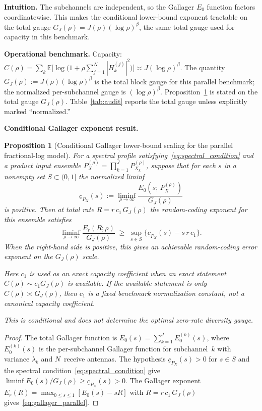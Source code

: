 \documentclass[lettersize,onecolumn]{IEEEtran}
\newtheorem{proposition}{Proposition}
\newcommand{\E}{\mathbb{E}}
\newcommand{\snr}{\rho}
\begin{document}
\textbf{Intuition.}
The subchannels are independent, so the Gallager $E_0$ function
factors coordinatewise. This makes the conditional lower-bound
exponent tractable on the total gauge
$G_J(\snr) = J(\snr)(\log\snr)^\beta$, the same total gauge used
for capacity in this benchmark.

\textbf{Operational benchmark.}
Capacity:
$C(\snr) = \sum_k \E\!\big[\log\!\big(1+\snr\sum_{j=1}^{N}
|H_k^{(j)}|^2\big)\big] \asymp J(\log\snr)^\beta$.
The quantity $G_J(\snr):=J(\snr)(\log\snr)^\beta$ is the total block
gauge for this parallel benchmark; the normalized per-subchannel gauge
is $(\log\snr)^\beta$.
Proposition~\ref{thm:gallager_parallel} is stated on the total
gauge $G_J(\snr)$. Table~\ref{tab:audit} reports the total gauge
unless explicitly marked ``normalized.''

\textbf{Conditional Gallager exponent result.}

\begin{proposition}[Conditional Gallager lower-bound scaling for the
parallel fractional-log model]\label{thm:gallager_parallel}
For a spectral profile satisfying~\eqref{eq:spectral_condition} and
a product input ensemble
$P_X^{(\snr)}=\prod_{k=1}^J P_{X_k}^{(\snr)}$, suppose that for
each $s$ in a nonempty set $S\subset(0,1]$ the normalized liminf
\[
\underline{c}_{P_X}(s)
    :=
    \liminf_{\snr\to\infty}
    \frac{E_0(s;\,P_X^{(\snr)})}{G_J(\snr)}
\]
is positive. Then at total rate $R = r\,c_1\,G_J(\snr)$ the
random-coding exponent for this ensemble satisfies
\begin{equation}\label{eq:gallager_parallel}
\liminf_{\snr\to\infty}
    \frac{E_r(R;\snr)}{G_J(\snr)}
    \;\ge\;
    \sup_{s\in S}
    \{\underline{c}_{P_X}(s) - s\,r\,c_1\}.
\end{equation}
When the right-hand side is positive, this gives an achievable
random-coding error exponent on the $G_J(\snr)$ scale.

Here $c_1$ is used as an exact capacity coefficient when an exact
statement $C(\snr) \sim c_1 G_J(\snr)$ is available. If the available
statement is only $C(\snr) \asymp G_J(\snr)$, then $c_1$ is a fixed
benchmark normalization constant, not a canonical capacity
coefficient.

This is conditional and does not determine the optimal zero-rate
diversity gauge.
\end{proposition}

\begin{proof}
The total Gallager function is $E_0(s) = \sum_{k=1}^{J} E_0^{(k)}(s)$,
where $E_0^{(k)}(s)$ is the per-subchannel Gallager function for
subchannel~$k$ with variance $\lambda_k$ and $N$~receive antennas.
The hypothesis $\underline{c}_{P_X}(s) > 0$ for $s\in S$
and the spectral condition~\eqref{eq:spectral_condition}
give $\liminf E_0(s)/G_J(\snr) \ge \underline{c}_{P_X}(s) > 0$.
The Gallager exponent $E_r(R) = \max_{0\le s\le 1}[E_0(s)-sR]$
with $R = r\,c_1\,G_J(\snr)$
gives~\eqref{eq:gallager_parallel}.
\end{proof}
\end{document}

